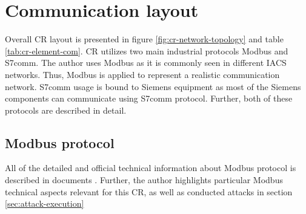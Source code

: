 \section{Communication layout}


Overall CR layout is presented in figure \ref{fig:cr-network-topology} and table \ref{tab:cr-element-com}. CR utilizes two main industrial protocols Modbus and S7comm. The author uses Modbus as it is commonly seen in different IACS networks. Thus, Modbus is applied to represent a realistic communication network. S7comm usage is bound to Siemens equipment as most of the Siemens components can communicate using S7comm protocol. Further, both of these protocols are described in detail.




\subsection{Modbus protocol}

All of the detailed and official technical information about Modbus protocol is described in documents \parencite{WEB-21-modbus-main-page, WEB-22-modbus-rfc-doc}. Further, the author highlights particular Modbus technical aspects relevant for this CR, as well as conducted attacks in section \ref{sec:attack-execution}

